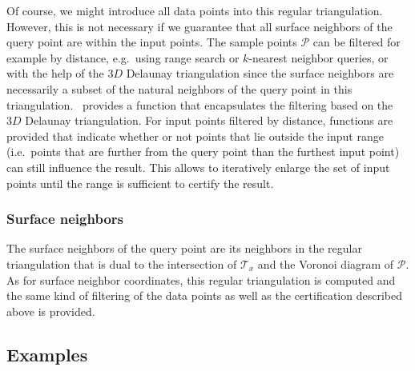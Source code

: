 Of course, we might introduce all data points into this regular
triangulation. However, this is not necessary if we guarantee that all
surface neighbors of the query point are within the input points. The
sample points $\mathcal{P}$ can be filtered for example by distance,
e.g.\ using range search or $k$-nearest neighbor queries, or with the
help of the $3D$ Delaunay triangulation since the surface neighbors
are necessarily a subset of the natural neighbors of the query point
in this triangulation. \cgal\ provides a function that encapsulates
the filtering based on the $3D$ Delaunay triangulation. For input
points filtered by distance, functions are provided that indicate
whether or not points that lie outside the input range (i.e.\ points
that are further from the query point than the furthest input point)
can still influence the result.  This allows to iteratively enlarge
the set of input points until the range is sufficient to certify the
result.

\subsubsection{Surface neighbors}

The surface neighbors of the query point are its neighbors in the
regular triangulation that is dual to the intersection of
$\mathcal{T}_x$ and the Voronoi diagram of $\mathcal{P}$. As for
surface neighbor coordinates, this regular triangulation is computed
and the same kind of filtering of the data points as well as the
certification described above is provided.


\subsection{Examples}

